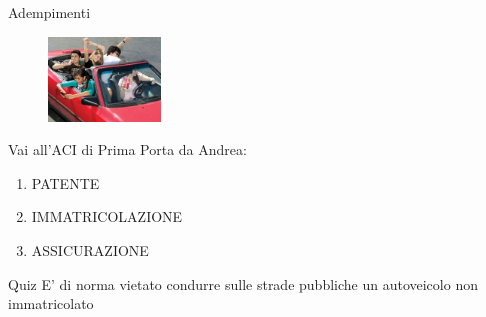 \documentclass{beamer}
\begin{document}
     \begin{frame}{Adempimenti}
         \transdissolve
         \begin{figure}[ht!]
    \centering
         \includegraphics[width = 3cm]{images/new_car.jpg}
    \end{figure}
    Vai all'ACI di Prima Porta da Andrea: 
    \begin{enumerate}
    \item<2-> PATENTE 
    \item<3-> IMMATRICOLAZIONE
    \item<4-> ASSICURAZIONE
    \end{enumerate}
        
        
     \end{frame}
     
     
     \begin{frame}{Quiz}
     E' di norma  vietato condurre sulle strade pubbliche un autoveicolo non immatricolato
     
     \begin{center}
     \end{center}
         
     \end{frame}
    
\end{document}

